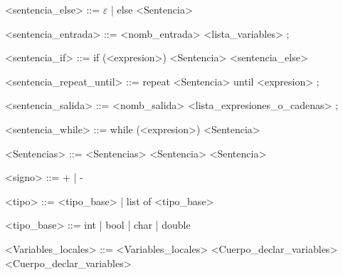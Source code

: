 \begin{grammar}
<sentencia_else> ::= $\varepsilon$ | else <Sentencia>

<sentencia_entrada> ::= <nomb_entrada> <lista_variables> ;

<sentencia_if> ::= if (<expresion>) <Sentencia> <sentencia_else>

<sentencia_repeat_until> ::= repeat <Sentencia> until <expresion> ;

<sentencia_salida> ::= <nomb_salida> <lista_expresiones_o_cadenas> ;

<sentencia_while> ::= while (<expresion>) <Sentencia>

<Sentencias> ::= <Sentencias> <Sentencia>
\alt <Sentencia>

<signo> ::= + | -

<tipo> ::= <tipo_base> | list of <tipo_base>

<tipo_base> ::= int | bool | char | double

<Variables_locales> ::= <Variables_locales> <Cuerpo_declar_variables>
\alt <Cuerpo_declar_variables>

\end{grammar}
